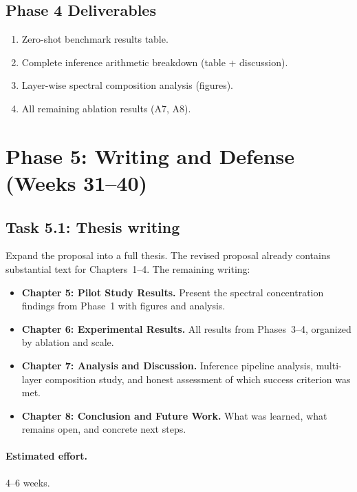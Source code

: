 \documentclass[12pt,a4paper]{article}
\begin{document}
\subsection{Phase 4 Deliverables}

\begin{enumerate}
    \item Zero-shot benchmark results table.
    \item Complete inference arithmetic breakdown (table + discussion).
    \item Layer-wise spectral composition analysis (figures).
    \item All remaining ablation results (A7, A8).
\end{enumerate}


\section{Phase 5: Writing and Defense (Weeks 31--40)}\label{sec:phase5}

\subsection{Task 5.1: Thesis writing}

Expand the proposal into a full thesis. The revised proposal already contains substantial text for Chapters~1--4. The remaining writing:

\begin{itemize}
    \item \textbf{Chapter 5: Pilot Study Results.} Present the spectral concentration findings from Phase~1 with figures and analysis.
    \item \textbf{Chapter 6: Experimental Results.} All results from Phases~3--4, organized by ablation and scale.
    \item \textbf{Chapter 7: Analysis and Discussion.} Inference pipeline analysis, multi-layer composition study, and honest assessment of which success criterion was met.
    \item \textbf{Chapter 8: Conclusion and Future Work.} What was learned, what remains open, and concrete next steps.
\end{itemize}

\paragraph{Estimated effort.} 4--6 weeks.
\end{document}
